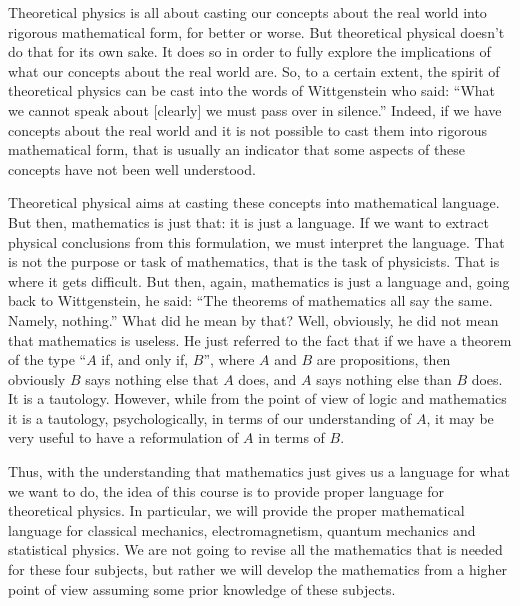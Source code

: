 Theoretical physics is all about casting our concepts about the real world into rigorous mathematical form, for better or worse. 
But theoretical physical doesn't do that for its own sake.
It does so in order to fully explore the implications of what our concepts about the real world are. So, to a certain extent, the spirit of theoretical physics can be cast into the words of Wittgenstein who said: ``What we cannot speak about [clearly] we must pass over in silence.''
Indeed, if we have concepts about the real world and it is not possible to cast them into rigorous mathematical form, that is usually an indicator that some aspects of these concepts have not been well understood.

Theoretical physical aims at casting these concepts into mathematical language.
But then, mathematics is just that: it is just a language.
If we want to extract physical conclusions from this formulation, we must interpret the language.
That is not the purpose or task of mathematics, that is the task of physicists.
That is where it gets difficult.
But then, again, mathematics is just a language and, going back to Wittgenstein, he said: ``The theorems of mathematics all say the same. Namely, nothing.''
What did he mean by that? Well, obviously, he did not mean that mathematics is useless.
He just referred to the fact that if we have a theorem of the type ``$A$ if, and only if, $B$'', where $A$ and $B$ are propositions, then obviously $B$ says nothing else that $A$ does, and $A$ says nothing else than $B$ does.
It is a tautology. However, while from the point of view of logic and mathematics it is a tautology, psychologically, in terms of our understanding of $A$, it may be very useful to have a reformulation of $A$ in terms of $B$.

Thus, with the understanding that mathematics just gives us a language for what we want to do, the idea of this course is to provide proper language for theoretical physics. In particular, we will provide the proper mathematical language for classical mechanics, electromagnetism, quantum mechanics and statistical physics. We are not going to revise all the mathematics that is needed for these four subjects, but rather we will develop the mathematics from a higher point of view assuming some prior knowledge of these subjects.





























